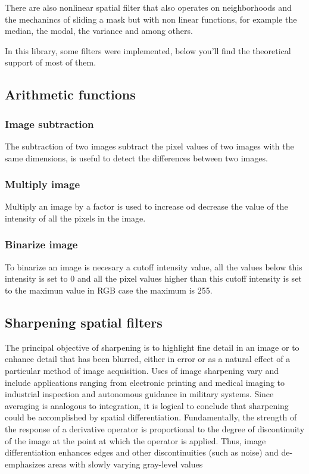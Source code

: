 \documentclass[a4paper]{article}
\begin{document}
There are also nonlinear spatial filter that also operates on neighborhoods and the mechanincs of sliding a mask but with non linear functions, for example the median, the modal, the variance and among others.

In this library, some filters were implemented, below you'll find the theoretical support of most of them.

\subsection{Arithmetic functions}

\subsubsection{Image subtraction}
The subtraction of two images subtract the pixel values of two images with the same dimensions, is useful to detect the differences between two images. 

\subsubsection{Multiply image}
Multiply an image by a factor is used to increase od decrease the value of the intensity of all the pixels in the image.

\subsubsection{Binarize image}
To binarize an image is necesary a cutoff intensity value, all the values below this intensity is set to 0 and all the pixel values higher than this cutoff intensity is set to the maximun value in RGB case the maximum is 255.


\subsection{Sharpening spatial filters}
The principal objective of sharpening is to highlight fine detail in an image or to enhance detail that has been blurred, either in error or as a natural effect of a particular method of image acquisition. Uses of image sharpening vary and include applications ranging from electronic printing and medical imaging to industrial inspection and autonomous guidance in military systems.
Since averaging is analogous to integration, it is logical to conclude that sharpening could be accomplished by spatial differentiation. Fundamentally, the strength of the response of a derivative operator is proportional to the degree of discontinuity of the image at the point at which the operator is applied. Thus, image differentiation enhances edges and other discontinuities (such as noise) and de-emphasizes areas with slowly varying gray-level values
\end{document}
